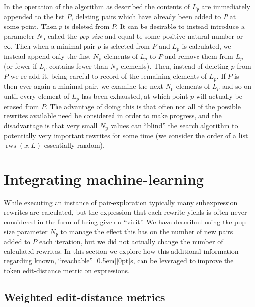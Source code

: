 \documentclass[a4paper]{article}
\DeclareMathOperator{\rws}{rws}
\theoremstyle{plain}
\theoremstyle{definition}
\newcommand{\xx}[1]{{\colorbox{gray!15}{\raisebox{0em}[0.5em][0pt]{\makebox[\width-0.4em]{\texttt{#1}}}}}}
\newcommand{\expr}{\xx{expr}}
\begin{document}
In the operation of the algorithm as described the contents of $L_p$ are immediately appended to the list $P$, deleting pairs which have already been added to $P$ at some point. Then $p$ is deleted from $P$. It can be desirable to instead introduce a parameter $N_\text{p}$ called the \textit{pop-size} and equal to some positive natural number or $\infty$. Then when a minimal pair $p$ is selected from $P$ and $L_p$ is calculated, we instead append only the first $N_\text{p}$ elements of $L_p$ to $P$ and remove them from $L_p$ (or fewer if $L_p$ contains fewer than $N_\text{p}$ elements). Then, instead of deleting $p$ from $P$ we re-add it, being careful to record of the remaining elements of $L_p$. If $P$ is then ever again a minimal pair, we examine the next $N_\text{p}$ elements of $L_p$ and so on until every element of $L_p$ has been exhausted, at which point $p$ will actually be erased from $P$. The advantage of doing this is that often not all of the possible rewrites available need be considered in order to make progress, and the disadvantage is that very small $N_\text{p}$ values can ``blind'' the search algorithm to potentially very important rewrites for some time (we consider the order of a list $\rws(x, L)$ essentially random).

\section{Integrating machine-learning}

While executing an instance of pair-exploration typically many subexpression rewrites are calculated, but the expression that each rewrite yields is often never considered in the form of being given a ``visit''. We have described using the pop-size parameter $N_\text{p}$ to manage the effect this has on the number of new pairs added to $P$ each iteration, but we did not actually change the number of calculated rewrites. In this section we explore how this additional information regarding known, ``reachable'' \expr{}s, can be leveraged to improve the token edit-distance metric on expressions.

\subsection{Weighted edit-distance metrics}
\end{document}
